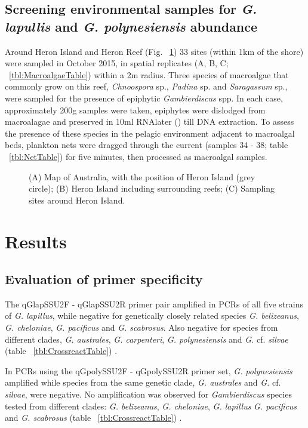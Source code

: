\documentclass[12pt]{article}
\begin{document}
\subsection{Screening environmental samples for \emph{G. lapullis} and \emph{G. polynesiensis} abundance}
Around Heron Island and Heron Reef (Fig. ~\ref{fig:samplesites}) 33 sites (within 1km of the shore) were sampled in October 2015, in spatial replicates (A, B, C; ~\ref{tbl:MacroalgaeTable}) within a 2m radius. Three species of macroalgae that commonly grow on this reef, \textit{Chnoospora} sp., \textit{Padina} sp. and \textit{Saragassum} sp., were sampled for the presence of epiphytic \emph{Gambierdiscus} spp. In each case, approximately 200g samples were taken, epiphytes were dislodged from macroalagae and preserved in 10ml RNAlater () till DNA extraction.
To assess the presence of these species in the pelagic environment adjacent to macroalgal beds, plankton nets were dragged through the current (samples 34 - 38; table ~\ref{tbl:NetTable}) for five minutes, then processed as macroalgal samples.

\FloatBarrier 
\begin{figure} 
\caption{(A) Map of Australia, with the position of Heron Island (grey circle); (B) Heron Island including surrounding reefs; (C) Sampling sites around Heron Island.} 
\label{fig:samplesites}
\end{figure} 
\FloatBarrier

\newpage
\section{Results}
\subsection{Evaluation of primer specificity}
The qGlapSSU2F - qGlapSSU2R primer pair amplified in PCRs of all five strains of \emph{G. lapillus}, while negative for genetically closely related species \emph{G. belizeanus}, \emph{G. cheloniae}, \emph{G. pacificus} and \emph{G. scabrosus}. Also negative for species from different clades, \emph{G. australes}, \emph{G. carpenteri}, \emph{G. polynesiensis} and \emph{G.} cf. \emph{silvae} (table ~\ref{tbl:CrossreactTable})  \cite{smith2016new,kretzschmar2016characterization}.

In PCRs using the qGpolySSU2F - qGpolySSU2R primer set, \emph{G. polynesiensis} amplified while species from the same genetic clade, \emph{G. australes} and \emph{G.} cf. \emph{silvae}, were negative. No amplification was observed for \emph{Gambierdiscus} species tested from different clades: \emph{G. belizeanus}, \emph{G. cheloniae}, \emph{G. lapillus }\emph{G. pacificus} and \emph{G. scabrosus} (table ~\ref{tbl:CrossreactTable}) \cite{kretzschmar2016characterization}.
\end{document}
